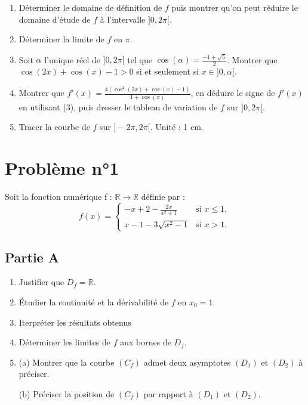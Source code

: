 \documentclass[12pt]{article}
\begin{document}
\begin{enumerate}
    \item Déterminer le domaine de définition de $f$ puis montrer qu’on peut réduire le domaine d’étude de $f$ à l’intervalle $]0, 2\pi[$.
    \item Déterminer la limite de $f$ en $\pi$.
    \item Soit $\alpha$ l’unique réel de $]0, 2\pi[$ tel que $\cos(\alpha) = \frac{-1 + \sqrt{5}}{2}$. Montrer que $\cos(2x) + \cos(x) - 1 > 0$ si et seulement si $x \in ]0, \alpha[$.
    \item Montrer que $f'(x) = \frac{4( \cos^2(2x) + \cos(x) - 1)}{1 + \cos(x)}$, en déduire le signe de $f'(x)$ en utilisant (3), puis dresser le tableau de variation de $f$ sur $]0, 2\pi[$.
    \item Tracer la courbe de $f$ sur $]-2\pi, 2\pi[$. Unité : 1 cm.
\end{enumerate}

\section*{Problème n°1}

Soit la fonction numérique  f : $\mathbb{R} \to \mathbb{R}$  définie par :
\[
f(x) =
\begin{cases}
-x + 2 - \frac{2x}{x^2 + 1} & \text{si } x \leq 1, \\
x - 1 - 3\sqrt{x^2 - 1} & \text{si } x > 1.
\end{cases}
\]

\subsection*{Partie A}

\begin{enumerate}
    \item Justifier que $D_f = \mathbb{R}$.
    \item Étudier la continuité et la dérivabilité de $f$ en $x_0 = 1$.
    \item Iterpréter les résultats obtenus
    \item Déterminer les limites de $f$ aux bornes de $D_f$.
    \item (a) Montrer que la courbe $(C_f)$ admet deux asymptotes $(D_1)$ et $(D_2)$ à préciser.
\end{enumerate}
\begin{enumerate}
    \item[(b)] Préciser la position de \( (C_f) \) par rapport à \( (D_1) \) et \( (D_2) \).
\end{enumerate}
\end{document}
